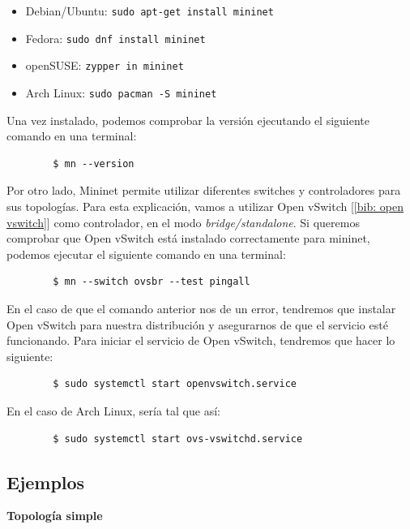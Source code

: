 \documentclass[a4paper, oneside, 12pt]{book}
\begin{document}
	\begin{itemize}
		\item Debian/Ubuntu: \texttt{sudo apt-get install mininet}
		\item Fedora: \texttt{sudo dnf install mininet}
		\item openSUSE: \texttt{zypper in mininet}
		\item Arch Linux: \texttt{sudo pacman -S mininet}
	\end{itemize}

	\noindent Una vez instalado, podemos comprobar la versión ejecutando el siguiente comando en una terminal:
	\begin{verbatim}
		$ mn --version
	\end{verbatim}

	\noindent Por otro lado, Mininet permite utilizar diferentes switches y controladores para sus topologías. Para esta explicación, vamos a utilizar Open vSwitch [\ref{bib: open vswitch}] como controlador, en el modo \textit{bridge/standalone}. Si queremos comprobar que Open vSwitch está instalado correctamente para mininet, podemos ejecutar el siguiente comando en una terminal:
	\begin{verbatim}
		$ mn --switch ovsbr --test pingall
	\end{verbatim}

	\noindent En el caso de que el comando anterior nos de un error, tendremos que instalar Open vSwitch para nuestra distribución y asegurarnos de que el servicio esté funcionando. Para iniciar el servicio de Open vSwitch, tendremos que hacer lo siguiente:
	\begin{verbatim}
		$ sudo systemctl start openvswitch.service
	\end{verbatim}

	\noindent En el caso de Arch Linux, sería tal que así:
	\begin{verbatim}
		$ sudo systemctl start ovs-vswitchd.service
	\end{verbatim}

	
	\pagebreak
	
	\subsection{Ejemplos}
	
	\noindent \textbf{Topología simple}\\
	
\end{document}
